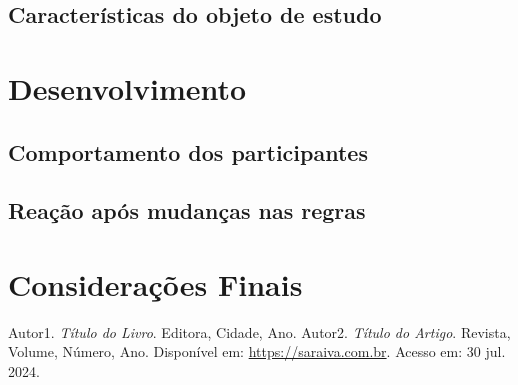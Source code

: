 \documentclass[a4paper,12pt]{article}
\begin{document}
\subsection{Características do objeto de estudo}
\lipsum[7-8]
\cite{ref1}

\section{Desenvolvimento}
\lipsum[9-10]
\cite{ref2}

\subsection{Comportamento dos participantes}
\lipsum[11-12]

\subsection{Reação após mudanças nas regras}
\lipsum[13-14]

\newpage

\section{Considerações Finais}
\lipsum[15-16]

\newpage

\begin{thebibliography}{9} %
     Autor1. \textit{Título do Livro}. Editora, Cidade, Ano.
     Autor2. \textit{Título do Artigo}. Revista, Volume, Número, Ano. Disponível em: \url{https://saraiva.com.br}. Acesso em: 30 jul. 2024.
\end{thebibliography}
\end{document}
